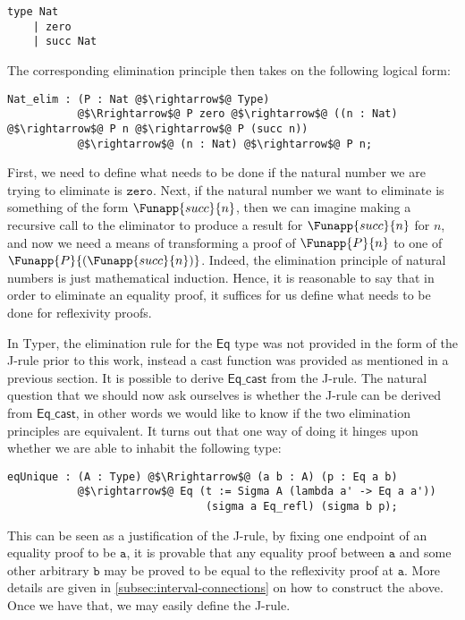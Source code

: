 \documentclass[12pt,twoside,maitrise]{dms}
\theoremstyle{definition}
\numberwithin{equation}{section}
\numberwithin{table}{chapter}
\numberwithin{figure}{chapter}
\newcommand\kw[1] {\textsf{#1}}
\newcommand\id[1] {\texttt{#1}}
\newcommand\fn[1] {\texttt{#1}}
\begin{document}
\begin{verbatim}
type Nat
    | zero
    | succ Nat
\end{verbatim}

The corresponding elimination principle then takes on the following logical form:

\begin{verbatim}
Nat_elim : (P : Nat @$\rightarrow$@ Type)
           @$\Rrightarrow$@ P zero @$\rightarrow$@ ((n : Nat) @$\rightarrow$@ P n @$\rightarrow$@ P (succ n))
           @$\rightarrow$@ (n : Nat) @$\rightarrow$@ P n;
\end{verbatim}

First, we need to define what needs to be done if the natural number we are
trying to eliminate is $\id{zero}$. Next, if the natural number we want to
eliminate is something of the form $\Funapp{succ}{n}$, then we can imagine
making a recursive call to the eliminator to produce a result for
$\Funapp{succ}{n}$ for $n$, and now we need a means of transforming a proof of
$\Funapp{P}{n}$ to one of $\Funapp{P}{(\Funapp{succ}{n})}$. Indeed, the
elimination principle of natural numbers is just mathematical induction. Hence,
it is reasonable to say that in order to eliminate an equality proof, it
suffices for us define what needs to be done for reflexivity proofs.

In Typer, the elimination rule for the $\kw{Eq}$ type was not provided in the
form of the J-rule prior to this work, instead a cast function was provided as
mentioned in a previous section. It is possible to derive $\kw{Eq\_cast}$ from
the J-rule. The natural question that we should now ask ourselves is whether the
J-rule can be derived from $\kw{Eq\_cast}$, in other words we would like to know
if the two elimination principles are equivalent. It turns out that one way of
doing it hinges upon whether we are able to inhabit the following type:

\begin{verbatim}
eqUnique : (A : Type) @$\Rrightarrow$@ (a b : A) (p : Eq a b)
           @$\rightarrow$@ Eq (t := Sigma A (lambda a' -> Eq a a'))
                               (sigma a Eq_refl) (sigma b p);
\end{verbatim}

This can be seen as a justification of the J-rule, by fixing one endpoint of an
equality proof to be $\fn{a}$, it is provable that any equality proof between
$\fn{a}$ and some other arbitrary $\fn{b}$ may be proved to be equal to the
reflexivity proof at $\fn{a}$. More details are given in
\autoref{subsec:interval-connections} on how to construct the above. Once we have that,
we may easily define the J-rule.
\end{document}
